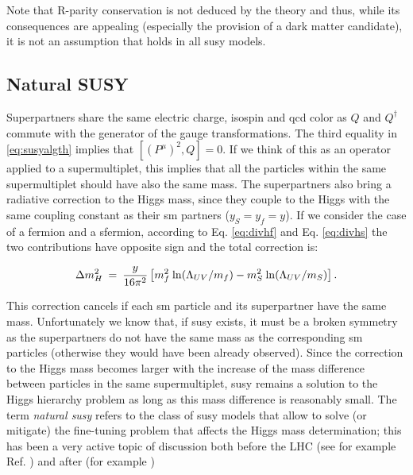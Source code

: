 Note that R-parity conservation is not deduced by the theory and thus, while its consequences are appealing (especially the provision of a dark matter candidate), it is not an assumption that holds in all \gls{susy} models.



\subsection{Natural SUSY}

Superpartners share the same electric charge, isospin and \gls{qcd} color as $Q$ and $Q^\dagger$ commute with the generator of the gauge transformations.
The third equality in \ref{eq:susyalgth} implies that $[ (P^\mu)^2 , Q  ]=0$. If we think of this as an operator applied to a supermultiplet, this implies that all the particles within the same supermultiplet should have also the same mass. The superpartners also bring a radiative correction to the Higgs mass, since they couple to the Higgs with the same coupling constant as their \gls{sm} partners ($y_S=y_f=y$). If we consider the case of a fermion and a sfermion, according to Eq. \ref{eq:divhf} and Eq. \ref{eq:divhs} the two contributions have opposite sign and the total correction is:

\begin{equation}
\Delta m_H^2 \>=\> {y\over 16 \pi^2}
\left [ m_f^2
\> {\rm ln}(\Lambda_{UV}/m_f) 
- m_S^2
\> {\rm ln}(\Lambda_{UV}/m_S) 
\right ].
\label{eq:divhsusy}
\end{equation}

This correction cancels if each \gls{sm} particle and its superpartner have the same mass. Unfortunately we know that, if \gls{susy} exists, it must be a broken symmetry as the superpartners do not have the same mass as the corresponding \gls{sm} particles (otherwise they would have been already observed). Since the correction to the Higgs mass becomes larger with the increase of the mass difference between particles in the same supermultiplet, \gls{susy} remains a solution to the Higgs hierarchy problem as long as this mass difference is reasonably small. The term \textit{natural \gls{susy}} refers to the class of \gls{susy} models that allow to solve (or mitigate) the fine-tuning problem that affects the Higgs mass determination; this has been a very active topic of discussion both before the LHC (see for example Ref. \cite{BARBIERI198863, Dimopoulos:1995mi}) and after (for example \cite{Papucci:2011wy, Casas:2014eca}) 

